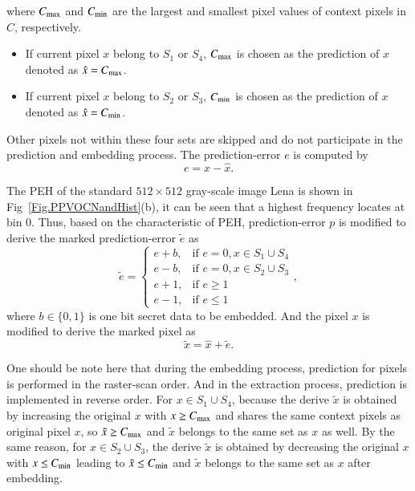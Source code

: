 \documentclass[review,3p,10pt,sort&compress]{elsarticle}
\begin{document}
where $C_{\rm max}$ and $C_{\rm min}$ are the largest and smallest pixel values of context pixels in $C$, respectively.
\begin{itemize}
  \item If current pixel $x$ belong to $S_1$ or $S_4$, $C_{\rm max}$ is chosen as the prediction of $x$ denoted as $\hat{x} = C_{\rm max}$.
  \item If current pixel $x$ belong to $S_2$ or $S_3$, $C_{\rm min}$ is chosen as the prediction of $x$ denoted as $\hat{x} = C_{\rm min}$.
\end{itemize}
Other pixels not within these four sets are skipped and do not participate in the prediction and embedding process. The prediction-error $e$ is computed by
\begin{equation}\label{eq:PE}
e = x - \hat{x}.
\end{equation}

The PEH of the standard $512 \times 512$ gray-scale image Lena is shown in Fig~\ref{Fig.PPVOCNandHist}(b), it can be seen that a highest frequency locates at bin 0. Thus, based on the characteristic of PEH, prediction-error $p$ is modified to derive the marked prediction-error $\tilde{e}$ as
\begin{equation}\label{eq:PPVOMPE}
    \tilde{e} = \left\{\begin{array}{ll}
    e + b,  & \text{if } e = 0, x \in S_1 \cup S_4 \\
    e - b,  & \text{if } e = 0, x \in S_2 \cup S_3 \\
    e + 1,  & \text{if } e \geq 1 \\
    e - 1,  & \text{if } e \leq 1
\end{array}\right.,
\end{equation}
where $b \in \{0,1\}$ is one bit secret data to be embedded. And the pixel $x$ is modified to derive the marked pixel as
\begin{equation}\label{eq:PPVOMPixel}
    \tilde{x} = \hat{x} + \tilde{e}.
\end{equation}

One should be note here that during the embedding process, prediction for pixels is performed in the raster-scan order. And in the extraction process, prediction is implemented in reverse order. For $x \in S_1 \cup S_4$, because the derive $\tilde{x}$ is obtained by increasing the original $x$ with $x \geq C_{\rm max}$ and shares the same context pixels as original pixel $x$, so $\tilde{x} \geq C_{\rm max}$ and $\tilde{x}$ belongs to the same set as $x$ as well. By the same reason, for $x \in S_2 \cup S_3$, the derive $\tilde{x}$ is obtained by decreasing the original $x$ with $x \leq C_{\rm min}$ leading to $\tilde{x} \leq C_{\rm min}$ and $\tilde{x}$ belongs to the same set as $x$ after embedding.
\end{document}
